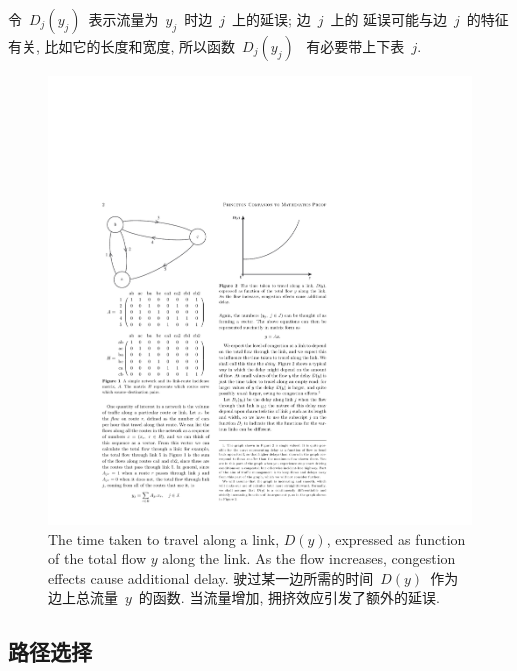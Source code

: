 \documentclass[a4paper,12pt, twocolumn]{article}
\begin{document}
令~$D_j(y_j)$~表示流量为~$y_{j}$~时边~$j$~上的延误; 边~$j$~上的
延误可能与边~$j$~的特征有关, 比如它的长度和宽度, 所以函数~$D_j(y_j)$~
有必要带上下表~$j$.

\begin{figure}[ht]
\centering
\includegraphics{p2}
\caption{The time taken to travel along a link, $D(y)$,
expressed as function of the total flow $y$ along the link.
As the flow increases, congestion effects cause additional delay.
驶过某一边所需的时间~$D(y)$~作为边上总流量~$y$~的函数. 
当流量增加, 拥挤效应引发了额外的延误. }
\label{Fig-pcm0052.2}
\end{figure}

\subsection{路径选择}
\end{document}
